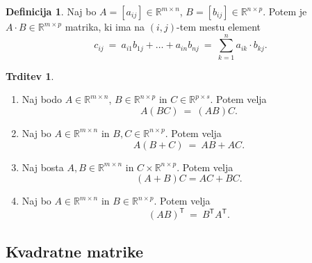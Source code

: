 \documentclass[11pt]{article}
\newcommand{\R}{\mathbb{R}}
\newcommand{\0}{\mathbf{0}}
\newcommand{\T}{\mathsf{T}}
\theoremstyle{definition}
\newtheorem{definicija}{Definicija}[section]
\theoremstyle{definition}
\newtheorem{trditev}{Trditev}[section]
\theoremstyle{definition}
\theoremstyle{definition}
\begin{document}
\begin{definicija}

Naj bo $A = [a_{ij}] \in \R^{m \times n}$, $B = [b_{ij}] \in \R^{n \times p}$. Potem je $A \cdot B \in \R^{m \times p}$ matrika, ki ima na $(i,j)$-tem mestu element
$$c_{ij} ~=~ a_{i1} b_{1j} + \ldots + a_{in} b_{nj} ~=~ \sum_{k=1}^n a_{ik} \cdot b_{kj}.$$

\end{definicija}
\vspace{0.5cm}

\begin{trditev}
~\\
\begin{enumerate}

\item Naj bodo $A \in \R^{m \times n}$, $B \in \R^{n \times p}$ in $C \in \R^{p \times s}$. Potem velja
$$A(BC) ~=~ (AB)C.$$

\item Naj bo $A \in \R^{m \times n}$ in  $B,C \in \R^{n \times p}$. Potem velja
$$A(B+C) ~=~ AB + AC.$$

\item Naj bosta $A,B \in \R^{m \times n}$ in $C \times \R^{n \times p}$. Potem velja
$$(A+B)C = AC + BC.$$

\item Naj bo $A \in \R^{m \times n}$ in $B \in \R^{n \times p}$. Potem velja
$$(AB)^\T ~=~ B^\T A^\T.$$

\end{enumerate}

\end{trditev}
\vspace{0.5cm}


\subsection{Kvadratne matrike}
\vspace{0.5cm}
\end{document}
